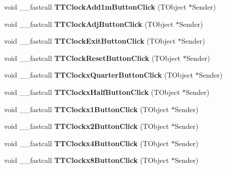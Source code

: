 \begin{DoxyCompactItemize}
void \+\_\+\+\_\+fastcall {\bfseries T\+T\+Clock\+Add1m\+Button\+Click} (T\+Object $\ast$Sender)
\item 
\mbox{\label{class_t_interface_a2c66ea203f3504fc2a9e5860a6c6d789}} 
void \+\_\+\+\_\+fastcall {\bfseries T\+T\+Clock\+Adj\+Button\+Click} (T\+Object $\ast$Sender)
\item 
\mbox{\label{class_t_interface_ac0f4c7c25b33ba2c72a6821065d528e8}} 
void \+\_\+\+\_\+fastcall {\bfseries T\+T\+Clock\+Exit\+Button\+Click} (T\+Object $\ast$Sender)
\item 
\mbox{\label{class_t_interface_a535ad680d3f229f12b44d3c299bce209}} 
void \+\_\+\+\_\+fastcall {\bfseries T\+T\+Clock\+Reset\+Button\+Click} (T\+Object $\ast$Sender)
\item 
\mbox{\label{class_t_interface_ad83e07e35e7ac413a528f5f4df8f8992}} 
void \+\_\+\+\_\+fastcall {\bfseries T\+T\+Clockx\+Quarter\+Button\+Click} (T\+Object $\ast$Sender)
\item 
\mbox{\label{class_t_interface_a3328f78be04b67a099be5b4ba90d7a23}} 
void \+\_\+\+\_\+fastcall {\bfseries T\+T\+Clockx\+Half\+Button\+Click} (T\+Object $\ast$Sender)
\item 
\mbox{\label{class_t_interface_a08fd2066bb1c0d84fc952b259ad430f7}} 
void \+\_\+\+\_\+fastcall {\bfseries T\+T\+Clockx1\+Button\+Click} (T\+Object $\ast$Sender)
\item 
\mbox{\label{class_t_interface_a9cae187911cf974b08d7532ee9c3424d}} 
void \+\_\+\+\_\+fastcall {\bfseries T\+T\+Clockx2\+Button\+Click} (T\+Object $\ast$Sender)
\item 
\mbox{\label{class_t_interface_ab716d9b9d030fd6acd134ad9a99ac21a}} 
void \+\_\+\+\_\+fastcall {\bfseries T\+T\+Clockx4\+Button\+Click} (T\+Object $\ast$Sender)
\item 
\mbox{\label{class_t_interface_ad565ae7d179a5230e8679c0d4e4666e5}} 
void \+\_\+\+\_\+fastcall {\bfseries T\+T\+Clockx8\+Button\+Click} (T\+Object $\ast$Sender)
\item 

\end{DoxyCompactItemize}
